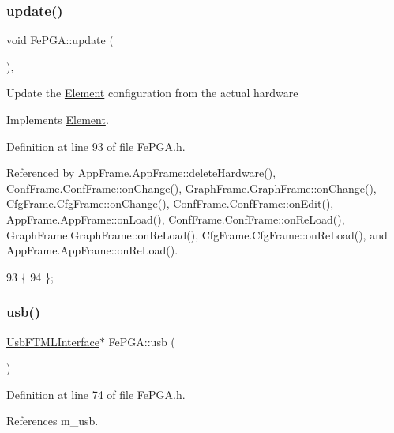 \subsubsection{\texorpdfstring{update()}{update()}}
{\footnotesize\ttfamily void Fe\+P\+G\+A\+::update (\begin{DoxyParamCaption}{ }\end{DoxyParamCaption})\hspace{0.3cm}{\ttfamily [inline]}, {\ttfamily [virtual]}}

Update the \hyperlink{classElement}{Element} configuration from the actual hardware 

Implements \hyperlink{classElement_a4e6c83efae95616ebddd03c793a26661}{Element}.



Definition at line 93 of file Fe\+P\+G\+A.\+h.



Referenced by App\+Frame.\+App\+Frame\+::delete\+Hardware(), Conf\+Frame.\+Conf\+Frame\+::on\+Change(), Graph\+Frame.\+Graph\+Frame\+::on\+Change(), Cfg\+Frame.\+Cfg\+Frame\+::on\+Change(), Conf\+Frame.\+Conf\+Frame\+::on\+Edit(), App\+Frame.\+App\+Frame\+::on\+Load(), Conf\+Frame.\+Conf\+Frame\+::on\+Re\+Load(), Graph\+Frame.\+Graph\+Frame\+::on\+Re\+Load(), Cfg\+Frame.\+Cfg\+Frame\+::on\+Re\+Load(), and App\+Frame.\+App\+Frame\+::on\+Re\+Load().


\begin{DoxyCode}
93                  \{
94   \};
\end{DoxyCode}
\mbox{\label{classFePGA_a4a7889dc3c2f88f623876ca475e66410}} 
\subsubsection{\texorpdfstring{usb()}{usb()}}
{\footnotesize\ttfamily \hyperlink{classUsbFTMLInterface}{Usb\+F\+T\+M\+L\+Interface}$\ast$ Fe\+P\+G\+A\+::usb (\begin{DoxyParamCaption}{ }\end{DoxyParamCaption})\hspace{0.3cm}{\ttfamily [inline]}}



Definition at line 74 of file Fe\+P\+G\+A.\+h.



References m\+\_\+usb.



